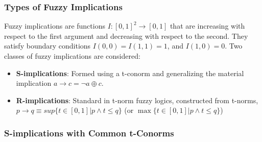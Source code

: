 \documentclass{beamer}
\begin{document}
\begin{frame}
\frametitle{Types of Fuzzy Implications}
Fuzzy implications are functions \( I: [0, 1]^2 \to [0, 1] \) that are increasing with respect to the first argument and decreasing with respect to the second. They satisfy boundary conditions \( I(0, 0) = I(1, 1) = 1 \), and \( I(1, 0) = 0 \). Two classes of fuzzy implications are considered:
\begin{itemize}
    \item \textbf{S-implications}: Formed using a t-conorm and generalizing the material implication \( a \to c = \neg a \oplus c \).
    \item \textbf{R-implications}: Standard in t-norm fuzzy logics,
      constructed from t-norms, $p \rightarrow q \equiv sup\{ t \in [0,1]
      | p \land t \leq q\}$ (or $\max\{ t \in [0,1] | p \land t \leq q\}$)
\end{itemize}
\end{frame}

\begin{frame}
\frametitle{S-implications with Common t-Conorms}
\end{frame}
\end{document}
